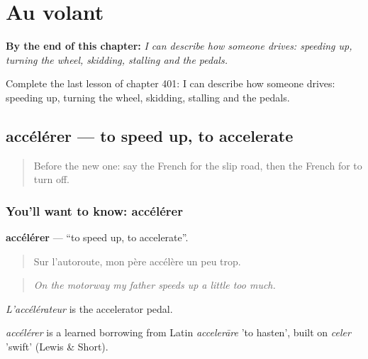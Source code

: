 
\chapter{Au volant}
\label{ch:fr-au-volant}

\begin{chapteropening}
\textbf{By the end of this chapter:} \emph{I can describe how someone drives: speeding up, turning the wheel, skidding, stalling and the pedals.}

Complete the last lesson of chapter 401: I can describe how someone drives: speeding up, turning the wheel, skidding, stalling and the pedals.
\end{chapteropening}

\section[accélérer]{accélérer — to speed up, to accelerate}

\label{lesson:FR-C401-accelerer}



\begin{quote}
Before the new one: say the French for the slip road, then the French for to turn off.
\end{quote}

\subsection*{You'll want to know: accélérer}
\textbf{accélérer} — \textquotedblleft{}to speed up, to accelerate\textquotedblright{}.

\begin{quote}
Sur l'autoroute, mon père accélère un peu trop.
\end{quote}

\begin{quote}
\emph{On the motorway my father speeds up a little too much.}
\end{quote}

\emph{L'accélérateur} is the accelerator pedal.

\begin{cousinweb}
\emph{accélérer} is a learned borrowing from Latin \emph{accelerāre} 'to hasten', built on \emph{celer} 'swift' (Lewis \& Short).
\end{cousinweb}

